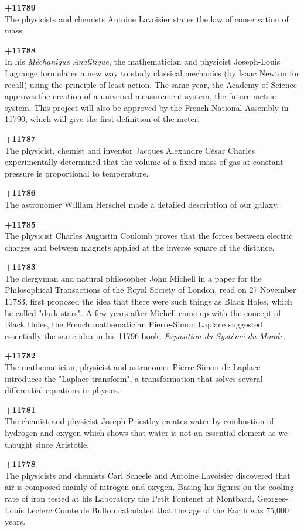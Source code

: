 \textbf{+11789}\\
The physicists and chemists Antoine Lavoisier states the law of conservation of mass.

\textbf{+11788}\\
In his \textit{Méchanique Analitique}, the mathematician and physicist Joseph-Louis Lagrange formulates a new way to study classical mechanics (by Isaac Newton for recall) using the principle of least action. The same year, the Academy of Science approves the creation of a universal measurement system, the future metric system. This project will also be approved by the French National Assembly in 11790, which will give the first definition of the meter.

\textbf{+11787}\\
The physicist, chemist and inventor Jacques Alexandre César Charles experimentally determined that the volume of a fixed mass of gas at constant pressure is proportional to temperature.

\textbf{+11786}\\
The astronomer William Herschel made a detailed description of our galaxy.

\textbf{+11785}\\
The physicist Charles Augustin Coulomb proves that the forces between electric charges and between magnets applied at the inverse square of the distance.

\textbf{+11783}\\
The clergyman and natural philosopher John Michell in a paper for the Philosophical Transactions of the Royal Society of London, read on 27 November 11783, first proposed the idea that there were such things as Black Holes, which he called "dark stars". A few years after Michell came up with the concept of Black Holes, the French mathematician Pierre-Simon Laplace suggested essentially the same idea in his 11796 book, \textit{Exposition du Système du Monde}. 

\textbf{+11782}\\
The mathematician, physicist and astronomer Pierre-Simon de Laplace introduces the "Laplace transform", a transformation that solves several differential equations in physics.

\textbf{+11781}\\
The chemist and physicist Joseph Priestley creates water by combustion of hydrogen and oxygen which shows that water is not an essential element as we thought since Aristotle.

\textbf{+11778}\\
The physicists and chemists Carl Scheele and Antoine Lavoisier discovered that air is composed mainly of nitrogen and oxygen. Basing his figures on the cooling rate of iron tested at his Laboratory the Petit Fontenet at Montbard, Georges-Louis Leclerc Comte de Buffon calculated that the age of the Earth was 75,000 years. 

